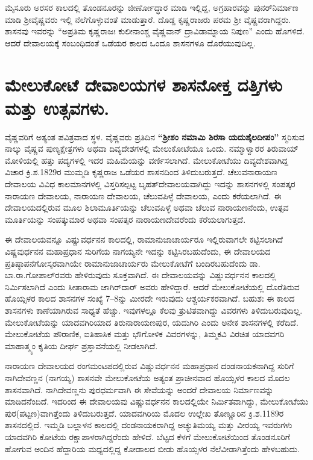 ಮೈಸೂರು ಅರಸರ ಕಾಲದಲ್ಲಿ ತೊಂಡನೂರನ್ನು ಜೀರ್ಣೋದ್ಧಾರ ಮಾಡಿ ಇಲ್ಲಿದ್ದ, ಅಗ್ರಹಾರವನ್ನು ಪುನರ್​ ನಿರ್ಮಾಣ ಮಾಡಿ ಶ‍್ರೀವೈಷ್ಣವರು ಇಲ್ಲಿ ನೆಲೆಗೊಳ್ಳುವಂತೆ ಮಾಡುತ್ತಾರೆ. ದೊಡ್ಡ ಕೃಷ್ಣರಾಜರು ಪರಮ ಶ‍್ರೀ ವೈಷ್ಣವರಾಗಿದ್ದರು. ಶಾಸನವು ಇವರನ್ನು “ಅಪ್ರತಿಮ ಕೃಷ್ಣರಾಜಃ ಕುಲೀನಾಂಶ್ಚ ವೈಷ್ಣವಾನ್​ ದ್ರಾವಿಡಾಮ್ನಾಯ ನಿಪುಣ” ಎಂದು ಹೊಗಳಿದೆ. ಆದರೆ ದೇವಾಲಯಕ್ಕೆ ಸಂಬಂಧಿದಂತೆ ಒಡೆಯರ ಕಾಲದ ಒಂದೂ ಶಾಸನಗಳೂ ದೊರೆಯುವುದಿಲ್ಲ.


\section{ಮೇಲುಕೋಟೆ ದೇವಾಲಯಗಳ ಶಾಸನೋಕ್ತ ದತ್ತಿಗಳು ಮತ್ತು ಉತ್ಸವಗಳು.}

ವೈಷ್ಣವರಿಗೆ ಅತ್ಯಂತ ಪವಿತ್ರವಾದ ಸ್ಥಳ. ವೈಷ್ಣವರು ಪ್ರತಿದಿನ \textbf{“ಶ‍್ರೀಶಂ ನಮಾಮಿ ಶಿರಸಾ ಯದುಶೈಲದೀಪಂ” }ಸ್ಮರಿಸುವ ನಾಲ್ಕು ವೈಷ್ಣವ ಪುಣ್ಯಕ್ಷೇತ್ರಗಳು ಅಥವಾ ದಿವ್ಯದೇಶಗಳಲ್ಲಿ ಮೇಲುಕೋಟೆಯೂ ಒಂದು. ನಮ್ಮಾಳ್ವಾರರ ತಿರುವಾಯ್​ ಮೋಳಿಯಲ್ಲಿ ಹತ್ತು ಪದ್ಯಗಳಲ್ಲಿ ಇದರ ಮಹಿಮೆಯನ್ನು ವರ್ಣಿಸಲಾಗಿದೆ. ಮೇಲುಕೋಟೆಯು ದಿವ್ಯದೇಶವಾಗಿದ್ದ ವಿಚಾರ ಕ್ರಿ.ಶ.1829ರ ಮುಮ್ಮಡಿ ಕೃಷ್ಣರಾಜ ಒಡೆಯರ ಶಾಸನದಿಂದ ತಿಳಿದುಬರುತ್ತದೆ. ಚೆಲುವನಾರಾಯಣ ದೇವಾಲಯ ವಿವಿಧ ಕಾಲಮಾನಗಳಲ್ಲಿ ವಿಸ್ತರಿಸಲ್ಪಟ್ಟ ಬೃಹತ್​ ದೇವಾಲಯವಾಗಿದ್ದು ಇದನ್ನು ಶಾಸನಗಳಲ್ಲಿ ಸಂಪತ್ಕರ ನಾರಾಯಣ ದೇವಾಲಯ, ನಾರಾಯಣ ದೇವಾಲಯ, ಚೆಲುವಪಿಳ್ಳೆ ದೇವಾಲಯ, ಎಂದು ಕರೆಯಲಾಗಿದೆ. ಈ ದೇವಾಲಯದಲ್ಲಿರುವ ಮೂಲ ಶಿಲಾಮೂರ್ತಿಯನ್ನು ಚೆಲುವಪಿಳ್ಳೆ ಅಥವಾ ಚೆಲುವ ನಾರಾಯಣನೆಂದು, ಉತ್ಸವ ಮೂರ್ತಿಯನ್ನು ಸಂಪತ್ಕುಮಾರ ಅಥವಾ ಸಂಪತ್ಕರ ನಾರಾಯಣದೇವರೆಂದು ಕರೆಯಲಾಗುತ್ತದೆ.

ಈ ದೇವಾಲಯವನ್ನೂ ವಿಷ್ಣುವರ್ಧನನ ಕಾಲದಲ್ಲಿ, ರಾಮಾನುಜಾಚಾರ್ಯರೂ ಇಲ್ಲಿರುವಾಗಲೇ ಕಟ್ಟಿಸಲಾಗಿದೆ ವಿಷ್ಣವುರ್ಧನನ ಮಹಾಪ್ರಧಾನ ಸುರಿಗೆಯ ನಾಗಯ್ಯನೇ ಇದನ್ನು ಕಟ್ಟಿಸಿರಬಹುದೆಂದು, ಈ ದೇವಾಲಯದ ಪ್ರತಿಷ್ಠಾಪನೆಗೋಸ್ಕರವಾಗಿಯೇ ರಾಮಾನುಜಾಚಾರ್ಯರು ಮೇಲುಕೋಟೆಗೆ ಬಂದಿರಬಹುದೆಂದು ಡಾ. ಬಾ.ರಾ.ಗೋಪಾಲ್​ರವರು ಹೇಳಿರುವುದು ಸೂಕ್ತವಾಗಿದೆ. ಈ ದೇವಾಲಯವನ್ನು ವಿಷ್ಣುವರ್ಧನನ ಕಾಲದಲ್ಲಿ ನಿರ್ಮಿಸಲಾಗಿದೆ ಎಂದು ಸೀತಾರಾಮ ಜಾಗಿರ್​ದಾರ್​ ಅವರು ಹೇಳಿದ್ದಾರೆ. ಆದರೆ ಮೇಲುಕೋಟೆಯಲ್ಲಿ ದೊರೆತಿರುವ ಹೊಯ್ಸಳರ ಕಾಲದ ಶಾಸನಗಳ ಸಂಖ್ಯೆ 7–8ನ್ನು ಮೀರದೇ ಇರುವುದು ಆಶ್ಚರ್ಯಕರವಾಗಿದೆ. ಬಹುಶಃ ಈ ಕಾಲದ ಶಾಸನಗಳು ಕಾಣೆಯಾಗಿರುವ ಸಾಧ್ಯತೆ ಹೆಚ್ಚು. ಇವುಗಳಲ್ಲೂ ಕೆಲವು ತ್ರುಟಿತವಾಗಿದ್ದು ವಿವರಗಳು ತಿಳಿದುಬರುವುದಿಲ್ಲ. ಮೇಲುಕೋಟೆಯನ್ನು ಯಾದವಗಿರಿಯಾದ ತಿರುನಾರಾಯಣಪುರ, ಯದುಗಿರಿ ಎಂದು ಅನೇಕ ಶಾಸನಗಳಲ್ಲಿ ಕರೆದಿದೆ. ಮೇಲುಕೋಟೆಯ ಪೌರಾಣಿಕ, ಐತಿಹಾಸಿಕ ಮತ್ತು ಭೌಗೋಳಿಕ ವಿವರಗಳನ್ನು, ತಿಮ್ಮಕವಿ ವಿರಚಿತ ಯಾದವಗರಿ ಮಾಹಾತ್ಮ್ಯಂ ಕೃತಿಯ ದೀರ್ಘ ಪ್ರಸ್ತಾವನೆಯಲ್ಲಿ ನೀಡಲಾಗಿದೆ.

ನಾರಾಯಣ ದೇವಾಲಯದ ರಂಗಮಂಟಪದಲ್ಲಿರುವ ವಿಷ್ಣುವರ್ಧನನ ಮಹಾಪ್ರಧಾನ ದಂಡನಾಯಕನಾಗಿದ್ದ ಸುರಿಗೆ ನಾಗಿದೇವಣ್ಣನ (ನಾಗಯ್ಯ) ಶಾಸನವೇ ಮೇಲುಕೋಟೆಯ ಅತ್ಯಂತ ಪ್ರಾಚೀನವಾದ ಹೊಯ್ಸಳರ ಕಾಲದ ಮೊದಲ ಶಾಸನವಾಗಿದೆ. ನಾಗಿದೇವಣ್ಣನು ಪುರಧರ್ಮವಾಗಿ ಈ ಸೇವೆಯನ್ನು ಅಂದರೆ ದೇವಾಲಯ ನಿರ್ಮಾಣವನ್ನು ಮಾಡಿದನೆಂದಿದೆ. ಇದರಿಂದ ಈ ದೇವಾಲಯವು ವಿಷ್ಣುವರ್ಧನನ ಕಾಲದಲ್ಲಿಯೇ ನಿರ್ಮಿತವಾಗಿದ್ದು, ಮೇಲುಕೋಟೆಯು ಪುರ(ಪಟ್ಟಣ)ವಾಗಿತ್ತೆಂದು ತಿಳಿದುಬರುತ್ತದೆ. ಯಾದವಗಿರಿಯ ಮೊದಲ ಉಲ್ಲೇಖ ತೊಣ್ಣೂರಿನ ಕ್ರಿ.ಶ.1189ರ ಶಾಸನದಲ್ಲಿದೆ. ಇಮ್ಮಡಿ ಬಲ್ಲಾಳನ ಕಾಲದಲ್ಲಿ ದಂಡನಾಯಕರಾಗಿದ್ದ ಅಚ್ಯುತಿಮಯ್ಯ ಮತ್ತು ವೀರಯ್ಯ ಇವರುಗಳು ಯಾದವಗಿರಿ ಕೋಟೆಯ ರಕ್ಷಾಪಾಳರಾಗಿದ್ದರೆಂದು ಹೇಳಿದೆ. ಬೆಟ್ಟದ ಕೆಳಗೆ ಮೇಲುಕೋಟೆಯಿಂದ ತೊಂಡನೂರಿಗೆ ಹೋಗುವ ಅಂದಿನ ಹೆದ್ದಾರಿಯ ಮಧ್ಯದಲ್ಲಿದ್ದ ಕೋಡಾಲದ ಬೀಡು ಹೊಯ್ಸಳರ ನೆಲೆವೀಡಾಗಿತ್ತೆಂದು ಹೇಳಬಹುದು.

